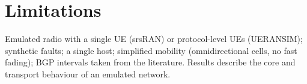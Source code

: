 \section{Limitations}
Emulated radio with a single UE (srsRAN) or protocol-level UEs (UERANSIM); synthetic faults; a
single host; simplified mobility (omnidirectional cells, no fast fading); BGP intervals taken from
the literature. Results describe the core and transport behaviour of an emulated network.

